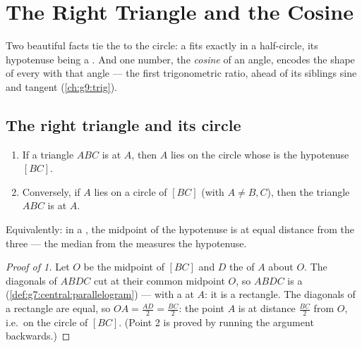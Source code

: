 \chapter{The Right Triangle and the Cosine}\label{ch:g8:cosine}

Two beautiful facts tie the  to the circle: a  fits exactly in a half-circle, its hypotenuse being a
. And one number, the \emph{cosine} of an angle, encodes the
shape of every  with that angle --- the first
trigonometric ratio, ahead of its siblings sine and tangent
(\cref{ch:g9:trig}).

\section{The right triangle and its circle}

\begin{theorem}\label{thm:g8:cosine:circle}
\begin{enumerate}
  \item If a triangle $ABC$ is  at $A$, then $A$ lies on
        the circle whose  is the hypotenuse $[BC]$.
  \item Conversely, if $A$ lies on a circle of  $[BC]$ (with
        $A \neq B, C$), then the triangle $ABC$ is  at
        $A$.
\end{enumerate}
Equivalently: in a , the midpoint of the hypotenuse is
at equal distance from the three  --- the median from the
 measures  the hypotenuse.
\end{theorem}

\begin{proof}[Proof of 1]
Let $O$ be the midpoint of $[BC]$ and $D$ the  of $A$ about
$O$. The diagonals of $ABDC$ cut at their common midpoint $O$, so
$ABDC$ is a  (\cref{def:g7:central:parallelogram}) ---
with a  at $A$: it is a rectangle. The diagonals of a
rectangle are equal, so $OA = \frac{AD}{2} = \frac{BC}{2}$: the
point $A$ is at distance $\frac{BC}{2}$ from $O$, i.e.\ on the circle
of  $[BC]$. (Point 2 is proved by running the argument
backwards.)
\end{proof}

